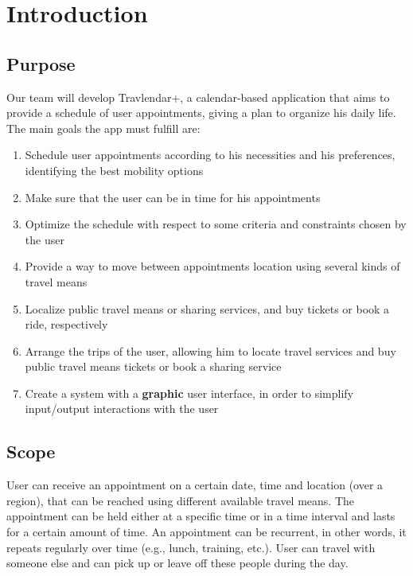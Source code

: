 \chapter{Introduction}

\section{Purpose}

Our team will develop Travlendar+, a calendar-based application that aims to provide a schedule of user appointments, giving a plan to organize his daily life.
The main goals the app must fulfill are:
\begin{enumerate}
\item Schedule user appointments according to his necessities and his preferences, identifying the best mobility options
\item Make sure that the user can be in time for his appointments
\item Optimize the schedule with respect to some criteria and constraints chosen by the user
\item Provide a way to move between appointments location using several kinds of travel means
\item Localize public travel means or sharing services, and buy tickets or book a ride, respectively
\item Arrange the trips of the user, allowing him to locate travel services and buy public travel means tickets or book a sharing service
\item Create a system with a \textbf{graphic} user interface, in order to simplify input/output interactions with the user
\end{enumerate}

\section{Scope}
User can receive an appointment on a certain date, time and location (over a region), that can be reached using different available travel means. The appointment can be held either at a specific time or in a time interval and lasts for a certain amount of time. An appointment can be recurrent, in other words, it repeats regularly over time (e.g., lunch, training, etc.). User can travel with someone else and can pick up or leave off these people during the day.

